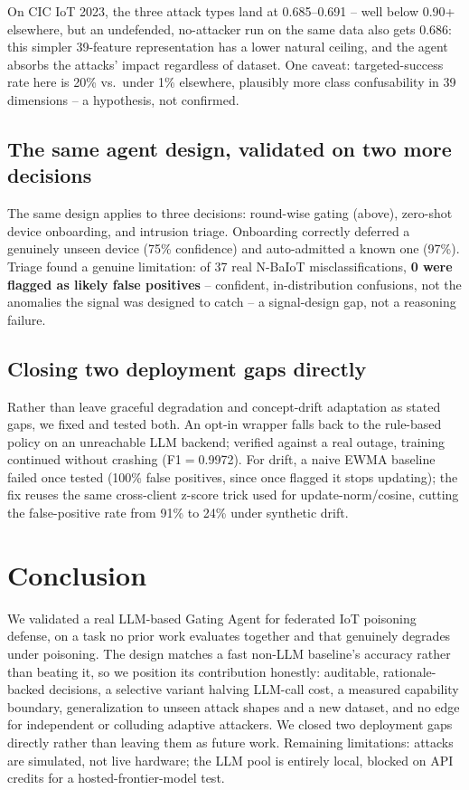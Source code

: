 \documentclass[conference]{IEEEtran}
\begin{document}
On CIC IoT 2023, the three attack types land at 0.685--0.691 -- well below 0.90+ elsewhere, but an undefended, no-attacker run on the same data also gets 0.686: this simpler 39-feature representation has a lower natural ceiling, and the agent absorbs the attacks' impact regardless of dataset. One caveat: targeted-success rate here is 20\% vs.\ under 1\% elsewhere, plausibly more class confusability in 39 dimensions -- a hypothesis, not confirmed.

\subsection{The same agent design, validated on two more decisions}
The same design applies to three decisions: round-wise gating (above), zero-shot device onboarding, and intrusion triage. Onboarding correctly deferred a genuinely unseen device (75\% confidence) and auto-admitted a known one (97\%). Triage found a genuine limitation: of 37 real N-BaIoT misclassifications, \textbf{0 were flagged as likely false positives} -- confident, in-distribution confusions, not the anomalies the signal was designed to catch -- a signal-design gap, not a reasoning failure.

\subsection{Closing two deployment gaps directly}
Rather than leave graceful degradation and concept-drift adaptation as stated gaps, we fixed and tested both. An opt-in wrapper falls back to the rule-based policy on an unreachable LLM backend; verified against a real outage, training continued without crashing (F1$=$0.9972). For drift, a naive EWMA baseline failed once tested (100\% false positives, since once flagged it stops updating); the fix reuses the same cross-client z-score trick used for update-norm/cosine, cutting the false-positive rate from 91\% to 24\% under synthetic drift.

\section{Conclusion}
We validated a real LLM-based Gating Agent for federated IoT poisoning defense, on a task no prior work evaluates together and that genuinely degrades under poisoning. The design matches a fast non-LLM baseline's accuracy rather than beating it, so we position its contribution honestly: auditable, rationale-backed decisions, a selective variant halving LLM-call cost, a measured capability boundary, generalization to unseen attack shapes and a new dataset, and no edge for independent or colluding adaptive attackers. We closed two deployment gaps directly rather than leaving them as future work. Remaining limitations: attacks are simulated, not live hardware; the LLM pool is entirely local, blocked on API credits for a hosted-frontier-model test.



\end{document}
